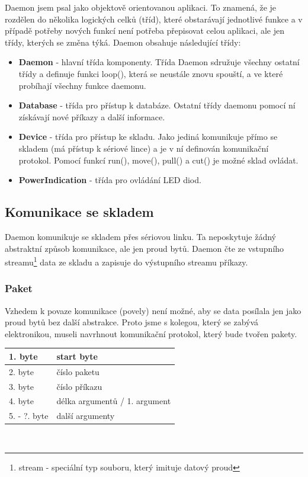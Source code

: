 \documentclass[12pt, a4paper, oneside]{article}
\begin{document}
Daemon jsem psal jako objektově orientovanou aplikaci. To znamená, že je rozdělen do několika logických celků (tříd), které obstarávají jednotlivé funkce a v případě potřeby nových funkcí není potřeba přepisovat celou aplikaci, ale jen třídy, kterých se změna týká. Daemon obsahuje následující třídy:

\begin{itemize}
\item \textbf{Daemon} - hlavní třída komponenty. Třída Daemon sdružuje všechny ostatní třídy a definuje funkci loop(), která se neustále znovu spouští, a ve které probíhají všechny funkce daemonu.
\item \textbf{Database} - třída pro přístup k databáze. Ostatní třídy daemonu pomocí ní získávají nové příkazy a další informace.
\item \textbf{Device} - třída pro přístup ke skladu. Jako jediná komunikuje přímo se skladem (má přístup k sériové lince) a je v ní definován komunikační protokol. Pomocí funkcí run(), move(), pull() a cut() je možné sklad ovládat.
\item \textbf{PowerIndication} - třída pro ovládání LED diod.
\end{itemize}

\subsection {Komunikace se skladem}

Daemon komunikuje se skladem přes sériovou linku. Ta neposkytuje žádný abstraktní způsob komunikace, ale jen proud bytů. Daemon čte ze vstupního streamu\footnote{stream - speciální typ souboru, který imituje datový proud} data ze skladu a zapisuje do výstupního streamu příkazy.

\subsubsection{Paket}

Vzhedem k povaze komunikace (povely) není možné, aby se data posílala jen jako proud bytů bez další abstrakce. Proto jsme s kolegou, který se zabývá elektronikou, museli navrhnout komunikační protokol, který bude tvořen pakety.

\vspace{3mm}
\begin{center}
\begin{tabular}{| l | l |}
\hline
1. byte & start byte \\ \hline
2. byte & číslo paketu \\ \hline
3. byte & číslo příkazu \\ \hline
4. byte & délka argumentů / 1. argument \\ \hline
5. - ?. byte & další argumenty \\ \hline
\end {tabular}
\\
\vspace{1mm}
\caption{Tabulka 1: Popis paketu}
\end{center}
\end{document}
